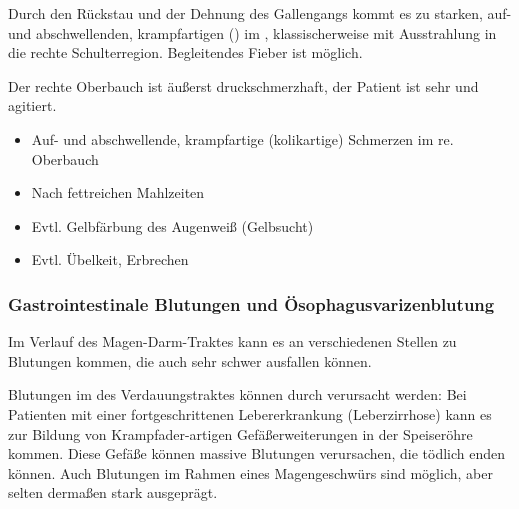 {

{%
Durch den Rückstau und der Dehnung des Gallengangs kommt es
zu starken, auf- und abschwellenden, krampfartigen
()  im , klassischerweise mit Ausstrahlung in die rechte
Schulterregion. Begleitendes Fieber ist möglich.

Der rechte Oberbauch ist äußerst druckschmerzhaft, der
Patient ist sehr  und agitiert.

\bigskip

\bigskip

\bigskip
}{
\begin{itemize}
  \item Auf- und abschwellende, krampfartige
  (kolikartige) Schmerzen im re. Oberbauch
  \item Nach fettreichen Mahlzeiten
  \item Evtl. Gelbfärbung des Augenweiß (Gelbsucht)
  \item Evtl. Übelkeit, Erbrechen
\end{itemize}
}{}{}{}



\subsubsection{Gastrointestinale
Blutungen und Ösophagusvarizenblutung}
\label{topic:oesophagusvarizenblutung}
\label{topic:gastrointestinale-blutung}

\nopagebreak[4]

{Im Verlauf des Magen-Darm-Traktes kann es an verschiedenen
Stellen zu Blutungen kommen, die auch sehr schwer ausfallen
können. 

Blutungen im  des Verdauungstraktes können
durch 
verursacht werden: Bei Patienten
mit einer fortgeschrittenen Lebererkrankung (Leberzirrhose) kann es zur Bildung von Krampfader-artigen Gefäßerweiterungen in der Speiseröhre
kommen. Diese Gefäße können massive Blutungen verursachen,
die tödlich enden können. Auch Blutungen im Rahmen eines
Magengeschwürs sind möglich, aber selten dermaßen stark
ausgeprägt.



}}

